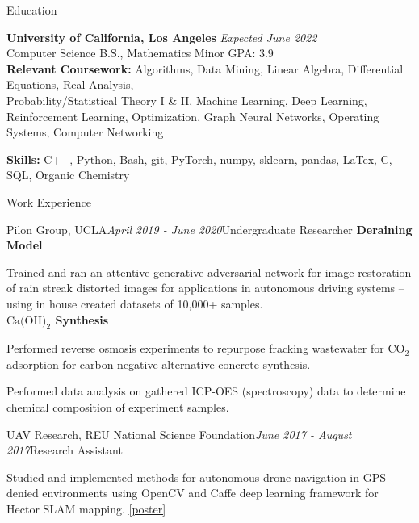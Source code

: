 \documentclass{resume}
\begin{document}
\begin{rSection}{Education}

{\bf University of California, Los Angeles} \hfill {\em Expected June 2022} 
\\ Computer Science B.S., Mathematics Minor \hfill {GPA: 3.9}\\
{\bf Relevant Coursework:} Algorithms, Data Mining, Linear Algebra, Differential Equations, Real Analysis,\\ Probability/Statistical Theory I \& II, 
Machine Learning, Deep Learning, Reinforcement Learning, Optimization, Graph Neural Networks, Operating Systems, Computer Networking
\end{rSection}

{\bf Skills:} C++, Python, Bash, git, PyTorch, numpy, sklearn, pandas, LaTex, C, SQL, Organic Chemistry


\begin{rSection}{Work Experience}
    \begin{rSubsection}{Pilon Group, UCLA}{\em April 2019 - June 2020}{Undergraduate Researcher}{}
        {\bf Deraining Model}
        \item Trained and ran an attentive generative adversarial network for image restoration of rain streak distorted
        images for applications in autonomous driving systems – using in house created datasets of 10,000+ samples.\\
        {\bf $\text{Ca}\text{(OH)}_{2}$ Synthesis}
        \item Performed reverse osmosis experiments to repurpose fracking wastewater for $\text{CO}_2$ adsorption 
        for carbon negative alternative concrete synthesis.
        \item Performed data analysis on gathered ICP-OES (spectroscopy) data to determine chemical composition of experiment samples.
    \end{rSubsection}
    \begin{rSubsection}{UAV Research, REU National Science Foundation}{\em June 2017 - August 2017}{Research Assistant}{}
        \item Studied and implemented methods for autonomous drone navigation in GPS denied environments using OpenCV and Caffe deep learning framework for Hector SLAM mapping.
        \href{https://docs.google.com/presentation/d/1fp-MPZUgKS_PhMD90d4aL0Rh0-YfghnEYHb3sHKmnGE/edit?usp=sharing}{[poster]}
    \end{rSubsection}
\end{rSection}
\end{document}
